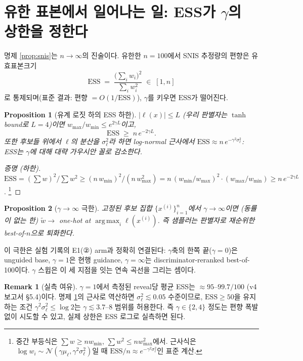 \documentclass[11pt]{article}
\newcommand{\ESS}{\mathrm{ESS}}
\DeclareMathOperator*{\argmax}{arg\,max}
\theoremstyle{plain}
\newtheorem{proposition}{Proposition}
\theoremstyle{definition}
\newtheorem{remark}{Remark}
\begin{document}
\section{유한 표본에서 일어나는 일: ESS가 $\gamma$의 상한을 정한다}

명제 \ref{prop:snis}는 $n \to \infty$의 진술이다. 유한한 $n = 100$에서 SNIS 추정량의
편향은 유효표본크기
\[
\ESS \;=\; \frac{\bigl(\sum_i w_i\bigr)^2}{\sum_i w_i^2} \;\in\; [1, n]
\]
로 통제되며(표준 결과: 편향 $= O(1/\ESS)$), $\gamma$를 키우면 $\ESS$가 떨어진다.

\begin{proposition}[유계 로짓 하의 ESS 하한]\label{prop:ess}
$|\ell(x)| \le L$ (우리 판별자는 $\tanh$ bound로 $L = 4$)이면 $w_{\max}/w_{\min} \le
e^{2\gamma L}$이고,
\[
\ESS \;\ge\; n\, e^{-2\gamma L}.
\]
또한 후보들 위에서 $\ell$의 분산을 $\sigma_\ell^2$라 하면 log-normal 근사에서
$\ESS \approx n\, e^{-\gamma^2 \sigma_\ell^2}$: ESS는 $\gamma$에 대해 대략
가우시안 꼴로 감소한다.
\end{proposition}

\begin{proof}[증명 (하한)]
$\ESS = (\sum w)^2/\sum w^2 \ge (n\,w_{\min})^2 / (n\,w_{\max}^2)
= n\,(w_{\min}/w_{\max})^2 \cdot (w_{\max}/w_{\min})
\ge n\, e^{-2\gamma L}$. \footnote{중간 부등식은 $\sum w \ge n w_{\min}$,
$\sum w^2 \le n w_{\max}^2$에서. 근사식은 $\log w_i \sim
\mathcal{N}(\gamma\mu_\ell, \gamma^2\sigma_\ell^2)$일 때
$\ESS/n \approx e^{-\gamma^2\sigma_\ell^2}$인 표준 계산.}
\end{proof}

\begin{proposition}[$\gamma \to \infty$ 극한]\label{prop:limit}
고정된 후보 집합 $\{x^{(i)}\}_{i=1}^{n}$에서 $\gamma \to \infty$이면 (동률이 없는 한)
$\tilde{w} \to$ one-hot at $\argmax_i \ell(x^{(i)})$. 즉 샘플러는 \emph{판별자로
재순위한 best-of-$n$}으로 퇴화한다.
\end{proposition}

이 극한은 실험 기록의 E1(②) arm과 정확히 연결된다: $\gamma$축의 한쪽 끝($\gamma=0$)은
unguided base, $\gamma=1$은 현행 guidance, $\gamma=\infty$는 discriminator-reranked
best-of-100이다. $\gamma$ 스윕은 이 세 지점을 잇는 연속 곡선을 그리는 셈이다.

\begin{remark}[실측 여유]
$\gamma = 1$에서 측정된 reveal당 평균 ESS는 $\approx 95$--$99.7/100$ (v4 보고서
\S5.4)이다. 명제 \ref{prop:ess}의 근사로 역산하면 $\sigma_\ell^2 \lesssim 0.05$
수준이므로, $\ESS \ge 50$을 유지하는 조건 $\gamma^2 \sigma_\ell^2 \le \log 2$는
$\gamma \lesssim 3.7$--$8$ 범위를 허용한다. 즉 $\gamma \in \{2, 4\}$ 정도는 편향 폭발
없이 시도할 수 있고, 실제 상한은 ESS 로그로 실측하면 된다.
\end{remark}
\end{document}
